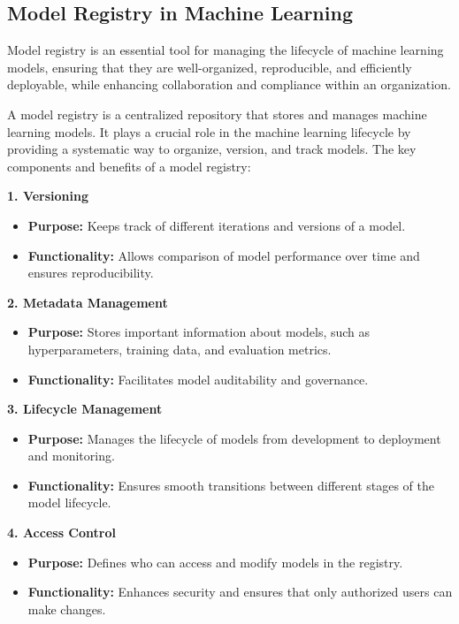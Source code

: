 \documentclass[letterpaper,12pt,notitlepage,twoside]{report}
\begin{document}
\subsection{Model Registry in Machine Learning}

    \begin{mathaside}[frametitle=\mathtitle{Why Model \color{firebrick}{registry}}]
            Model registry is an essential tool for managing the lifecycle of machine learning models, ensuring that they are well-organized, reproducible, and efficiently deployable, while enhancing collaboration and compliance within an organization.
    \end{mathaside}

A model registry is a centralized repository that stores and manages machine learning models. It plays a crucial role in the machine learning lifecycle by providing a systematic way to organize, version, and track models. The key components and benefits of a model registry:

\textbf{1. Versioning}
\begin{itemize}[noitemsep, topsep=0pt]
    \item \textbf{Purpose:} Keeps track of different iterations and versions of a model.
    \item \textbf{Functionality:} Allows comparison of model performance over time and ensures reproducibility.
\end{itemize}

\textbf{2. Metadata Management}
\begin{itemize}[noitemsep, topsep=0pt]
    \item \textbf{Purpose:} Stores important information about models, such as hyperparameters, training data, and evaluation metrics.
    \item \textbf{Functionality:} Facilitates model auditability and governance.
\end{itemize}

\textbf{3. Lifecycle Management}
\begin{itemize}[noitemsep, topsep=0pt]
    \item \textbf{Purpose:} Manages the lifecycle of models from development to deployment and monitoring.
    \item \textbf{Functionality:} Ensures smooth transitions between different stages of the model lifecycle.
\end{itemize}

\textbf{4. Access Control}
\begin{itemize}[noitemsep, topsep=0pt]
    \item \textbf{Purpose:} Defines who can access and modify models in the registry.
    \item \textbf{Functionality:} Enhances security and ensures that only authorized users can make changes.
\end{itemize}
\end{document}

